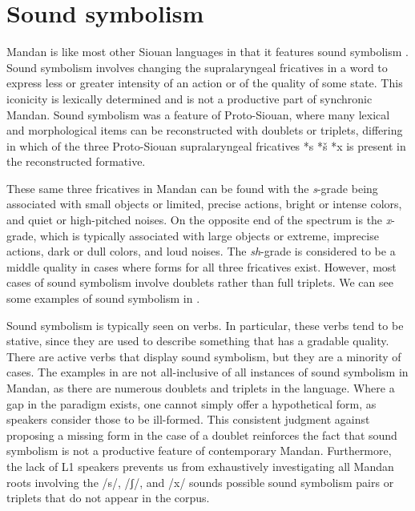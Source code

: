 \section{Sound symbolism}\label{soundsymbolism}

Mandan is like most other Siouan languages in that it features sound symbolism \citep[107]{parksrankin2001}. Sound symbolism involves changing the supralaryngeal fricatives in a word to express less or greater intensity of an action or of the quality of some state. This iconicity is lexically determined and is not a productive part of synchronic Mandan. Sound symbolism was a feature of Proto-Siouan, where many lexical and morphological items can be reconstructed with doublets or triplets, differing in which of the three Proto-Siouan supralaryngeal fricatives *s *š *x is present in the reconstructed formative.


These same three fricatives in Mandan can be found with the \textit{s}-grade being associated with small objects or limited, precise actions, bright or intense colors, and quiet or high-pitched noises. On the opposite end of the spectrum is the \textit{x}-grade, which is typically associated with large objects or extreme, imprecise actions, dark or dull colors, and loud noises. The \textit{sh}-grade is considered to be a middle quality in cases where forms for all three fricatives exist. However, most cases of sound symbolism involve doublets rather than full triplets. We can see some examples of sound symbolism   in .



Sound symbolism is typically seen on verbs. In particular, these verbs tend to be stative, since they are used to describe something that has a gradable quality. There are active verbs that display sound symbolism, but they are a minority of cases. The examples in  are not all-inclusive of all instances of sound symbolism in Mandan, as there are numerous doublets and triplets in the language. Where a gap in the paradigm exists, one cannot simply offer a hypothetical form, as speakers consider those to be ill-formed. This consistent judgment against proposing a missing form in the case of a doublet reinforces the fact that sound symbolism is not a productive feature of contemporary Mandan. Furthermore, the lack of L1 speakers prevents us from exhaustively investigating all Mandan roots involving the /s/, /ʃ/, and /x/ sounds possible sound symbolism pairs or triplets that do not appear in the corpus.





